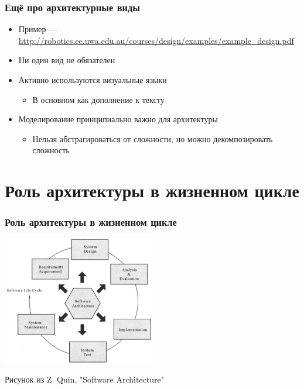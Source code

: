 \documentclass[xetex,mathserif,serif]{beamer}
\begin{document}
	\begin{frame}
		\frametitle{Ещё про архитектурные виды}
		\begin{itemize}
			\item Пример --- \url{http://robotics.ee.uwa.edu.au/courses/design/examples/example_design.pdf}
			\item Ни один вид не обязателен
			\item Активно используются визуальные языки
			\begin{itemize}
				\item В основном как дополнение к тексту
			\end{itemize}
			\item Моделирование принципиально важно для архитектуры
			\begin{itemize}
				\item Нельзя абстрагироваться от сложности, но можно декомпозировать сложность
			\end{itemize}
		\end{itemize}
	\end{frame}

	\section{Роль архитектуры в жизненном цикле}

	\begin{frame}
		\frametitle{Роль архитектуры в жизненном цикле}
		\begin{center}
			\includegraphics[width=0.5\textwidth]{architectureLifeCycle.png}

			\begin{tiny}
				Рисунок из Z. Quin, "Software Architecture"
			\end{tiny}
		\end{center}
	\end{frame}
\end{document}
